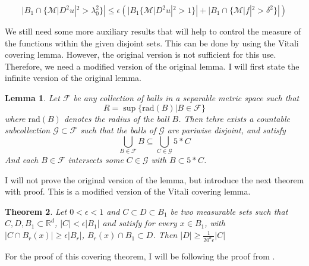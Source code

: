 \documentclass[12pt]{artikel1}
\newtheorem{theorem}{Theorem}[section]
\newtheorem{lemma}[theorem]{Lemma}
\begin{document}
\begin{equation*}
    |B_1\cap\{\mathcal{M}|D^2u|^2>\lambda_0^2\}|\leq\epsilon(|B_1\{\mathcal{M}|D^2u|^2>1\}|+|B_1\cap\{\mathcal{M}|f|^2>\delta^2\}|)
\end{equation*}

We still need some more auxiliary results that will help to control the measure of the functions within the given disjoint sets. This can be done by using the Vitali covering lemma. However, the original version is not sufficient for this use. Therefore, we need a modified version of the original lemma. I will first state the infinite version of the original lemma.

\begin{lemma}
    Let $\mathcal{F}$ be any collection of balls in a separable metric space such that
    \begin{equation*}
        R=\sup\{\mathrm{rad}(B)|B\in \mathcal{F}\}
    \end{equation*}
    where $\mathrm{rad}(B)$ denotes the radius of the ball $B$. Then tehre exists a countable subcollection $\mathcal{G}\subset\mathcal{F}$ such that the balls of $\mathcal{G}$ are pariwise disjoint, and satisfy
    \begin{equation*}
        \bigcup_{B\in\mathcal{F}}B\subseteq\bigcup_{C\in\mathcal{G}}5*C
    \end{equation*}
    And each $B\in\mathcal{F}$ intersects some $C\in\mathcal{G}$ with $B\subset5*C$.
\end{lemma}

I will not prove the original version of the lemma, but introduce the next theorem with proof. This is a modified version of the Vitali covering lemma.

\begin{theorem}\label{thm:vitali}
    Let $0<\epsilon<1$ and $C\subset D\subset B_1$ be two measurable sets such that $C,D,B_1\subset\mathbb{R}^d$, $|C|<\epsilon |B_1|$ and satisfy for every $x\in B_1$, with $|C\cap B_r(x)|\geq\epsilon|B_r|$, $B_r(x)\cap B_1\subset D$. Then $|D|\geq\frac{1}{20^d\epsilon}|C|$
\end{theorem}

For the proof of this covering theorem, I will be following the proof from \cite{wang_geometric_2003}. 
\end{document}
